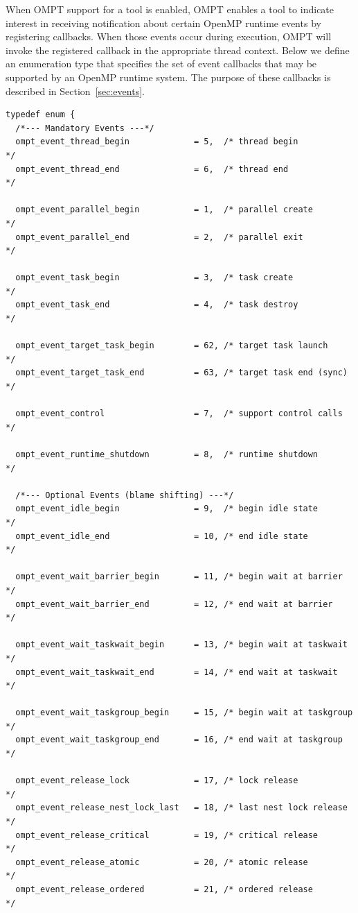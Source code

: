 \documentclass{article}
\begin{document}
{When OMPT support for a tool is enabled, 
OMPT enables a tool to indicate interest in receiving notification about certain OpenMP runtime events by registering callbacks. When those events occur during execution, OMPT will invoke the registered callback in the appropriate thread context.
Below we define an enumeration type that specifies the set of event callbacks that may be supported by an OpenMP runtime system. 
The purpose of these callbacks is described in Section~\ref{sec:events}. 

\begin{verbatim}
typedef enum {  
  /*--- Mandatory Events ---*/
  ompt_event_thread_begin             = 5,  /* thread begin               */
  ompt_event_thread_end               = 6,  /* thread end                 */

  ompt_event_parallel_begin           = 1,  /* parallel create            */
  ompt_event_parallel_end             = 2,  /* parallel exit              */

  ompt_event_task_begin               = 3,  /* task create                */
  ompt_event_task_end                 = 4,  /* task destroy               */

  ompt_event_target_task_begin        = 62, /* target task launch         */
  ompt_event_target_task_end          = 63, /* target task end (sync)     */

  ompt_event_control                  = 7,  /* support control calls      */

  ompt_event_runtime_shutdown         = 8,  /* runtime shutdown           */

  /*--- Optional Events (blame shifting) ---*/  	
  ompt_event_idle_begin	              = 9,  /* begin idle state           */ 
  ompt_event_idle_end                 = 10, /* end idle state             */ 

  ompt_event_wait_barrier_begin       = 11, /* begin wait at barrier      */
  ompt_event_wait_barrier_end         = 12, /* end wait at barrier        */
  
  ompt_event_wait_taskwait_begin      = 13, /* begin wait at taskwait     */
  ompt_event_wait_taskwait_end        = 14, /* end wait at taskwait       */
  
  ompt_event_wait_taskgroup_begin     = 15, /* begin wait at taskgroup    */
  ompt_event_wait_taskgroup_end       = 16, /* end wait at taskgroup      */

  ompt_event_release_lock             = 17, /* lock release               */
  ompt_event_release_nest_lock_last   = 18, /* last nest lock release     */
  ompt_event_release_critical         = 19, /* critical release           */
  ompt_event_release_atomic           = 20, /* atomic release             */
  ompt_event_release_ordered          = 21, /* ordered release            */


\end{verbatim}}
\end{document}
